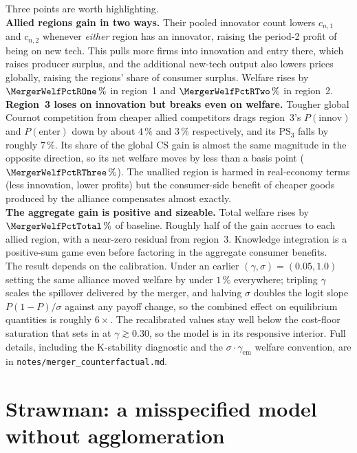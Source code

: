 \documentclass[12pt]{article}
\begin{document}
Three points are worth highlighting.\\

\textbf{Allied regions gain in two ways.} Their pooled innovator count
lowers $c_{n,1}$ and $c_{n,2}$ whenever \emph{either} region has an
innovator, raising the period-2 profit of being on new tech. This pulls
more firms into innovation and entry there, which raises producer surplus,
and the additional new-tech output also lowers prices globally, raising
the regions' share of consumer surplus. Welfare rises by
$\MergerWelfPctROne\,\%$ in region~1 and $\MergerWelfPctRTwo\,\%$ in
region~2.\\

\textbf{Region~3 loses on innovation but breaks even on welfare.} Tougher
global Cournot competition from cheaper allied competitors drags region~3's
$P(\mathrm{innov})$ and $P(\mathrm{enter})$ down by about $4\,\%$ and
$3\,\%$ respectively, and its $\mathrm{PS}_3$ falls by roughly $7\,\%$.
Its share of the global CS gain is almost the same magnitude in the
opposite direction, so its net welfare moves by less than a basis point
($\MergerWelfPctRThree\,\%$). The unallied region is harmed in real-economy
terms (less innovation, lower profits) but the consumer-side benefit of
cheaper goods produced by the alliance compensates almost exactly.\\

\textbf{The aggregate gain is positive and sizeable.} Total welfare rises
by $\MergerWelfPctTotal\,\%$ of baseline. Roughly half of the gain accrues
to each allied region, with a near-zero residual from region~3. Knowledge
integration is a positive-sum game even before factoring in the aggregate
consumer benefits.\\

The result depends on the calibration. Under an earlier
$(\gamma, \sigma) = (0.05, 1.0)$ setting the same alliance moved welfare by
under $1\,\%$ everywhere; tripling $\gamma$ scales the spillover delivered
by the merger, and halving $\sigma$ doubles the logit slope $P(1-P)/\sigma$
against any payoff change, so the combined effect on equilibrium quantities
is roughly $6\times$. The recalibrated values stay well below the cost-floor
saturation that sets in at $\gamma \gtrsim 0.30$, so the model is in its
responsive interior. Full details, including the K-stability diagnostic and
the $\sigma\!\cdot\!\gamma_{\mathrm{em}}$ welfare convention, are in
\texttt{notes/merger\_counterfactual.md}.

\section{Strawman: a misspecified model without agglomeration}
\label{sec:misspec}
\end{document}

